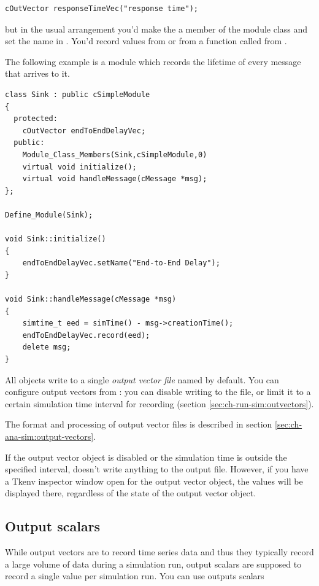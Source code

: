 \begin{verbatim}
cOutVector responseTimeVec("response time");
\end{verbatim}

but in the usual arrangement you'd make the  a member
of the module class and set the name in . You'd
record values from  or from a function called from
.

The following example is a  module which records the lifetime
of every message that arrives to it.

\begin{verbatim}
class Sink : public cSimpleModule
{
  protected:
    cOutVector endToEndDelayVec;
  public:
    Module_Class_Members(Sink,cSimpleModule,0)
    virtual void initialize();
    virtual void handleMessage(cMessage *msg);
};

Define_Module(Sink);

void Sink::initialize()
{
    endToEndDelayVec.setName("End-to-End Delay");
}

void Sink::handleMessage(cMessage *msg)
{
    simtime_t eed = simTime() - msg->creationTime();
    endToEndDelayVec.record(eed);
    delete msg;
}
\end{verbatim}


All  objects write to a single \textit{output vector file}
named  by default.
You can configure output vectors from :
you can disable writing to the file, or limit it to a certain
simulation time interval for recording (section
\ref{sec:ch-run-sim:outvectors}).

The format and processing of output vector files is described in section
\ref{sec:ch-ana-sim:output-vectors}.

If the output vector object is disabled or the simulation time is
outside the specified interval,  doesn't write
anything to the output file. However, if you have a Tkenv inspector
window open for the output vector object,
the values will be displayed there, regardless of the state of the
output vector object.



\subsection{Output scalars}

While output vectors are to record time series data and thus they
typically record a large volume of data during a simulation run,
output scalars are supposed to record a single
value per simulation run. You can use outputs scalars

